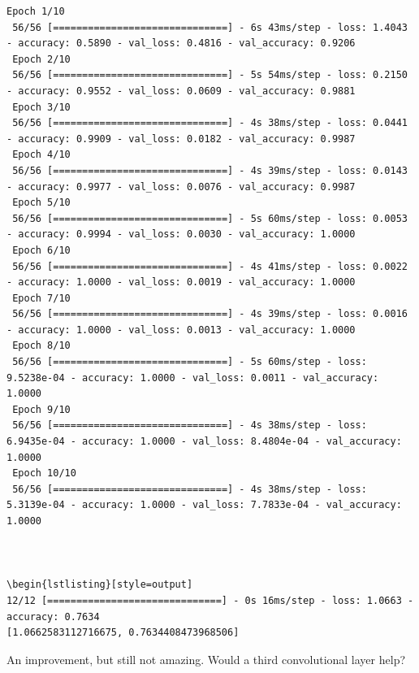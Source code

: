 \documentclass{article}
\begin{document}


\begin{lstlisting}[style=output]
 Epoch 1/10
 56/56 [==============================] - 6s 43ms/step - loss: 1.4043 - accuracy: 0.5890 - val_loss: 0.4816 - val_accuracy: 0.9206
 Epoch 2/10
 56/56 [==============================] - 5s 54ms/step - loss: 0.2150 - accuracy: 0.9552 - val_loss: 0.0609 - val_accuracy: 0.9881
 Epoch 3/10
 56/56 [==============================] - 4s 38ms/step - loss: 0.0441 - accuracy: 0.9909 - val_loss: 0.0182 - val_accuracy: 0.9987
 Epoch 4/10
 56/56 [==============================] - 4s 39ms/step - loss: 0.0143 - accuracy: 0.9977 - val_loss: 0.0076 - val_accuracy: 0.9987
 Epoch 5/10
 56/56 [==============================] - 5s 60ms/step - loss: 0.0053 - accuracy: 0.9994 - val_loss: 0.0030 - val_accuracy: 1.0000
 Epoch 6/10
 56/56 [==============================] - 4s 41ms/step - loss: 0.0022 - accuracy: 1.0000 - val_loss: 0.0019 - val_accuracy: 1.0000
 Epoch 7/10
 56/56 [==============================] - 4s 39ms/step - loss: 0.0016 - accuracy: 1.0000 - val_loss: 0.0013 - val_accuracy: 1.0000
 Epoch 8/10
 56/56 [==============================] - 5s 60ms/step - loss: 9.5238e-04 - accuracy: 1.0000 - val_loss: 0.0011 - val_accuracy: 1.0000
 Epoch 9/10
 56/56 [==============================] - 4s 38ms/step - loss: 6.9435e-04 - accuracy: 1.0000 - val_loss: 8.4804e-04 - val_accuracy: 1.0000
 Epoch 10/10
 56/56 [==============================] - 4s 38ms/step - loss: 5.3139e-04 - accuracy: 1.0000 - val_loss: 7.7833e-04 - val_accuracy: 1.0000



\begin{lstlisting}[style=output]
12/12 [==============================] - 0s 16ms/step - loss: 1.0663 - accuracy: 0.7634
[1.0662583112716675, 0.7634408473968506]
\end{lstlisting}

An improvement, but still not amazing. Would a third convolutional layer help?


\end{document}
